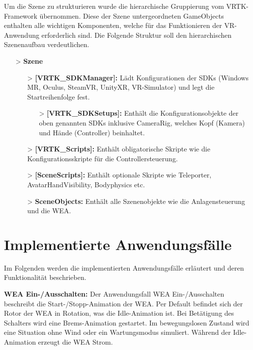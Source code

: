 Um die Szene zu strukturieren wurde die hierarchische Gruppierung vom VRTK-Framework übernommen. Diese der Szene untergeordneten GameObjects enthalten alle wichtigen Komponenten, welche für das Funktionieren der VR-Anwendung erforderlich sind. Die Folgende Struktur soll den hierarchischen Szenenaufbau verdeutlichen.

\begin{itemize}
\item[>] \textbf{Szene} 
	
	\begin{itemize}
	\item[>] \textbf{[VRTK\_SDKManager]:} Lädt Konfigurationen der SDKs (Windows MR, Oculus, SteamVR, UnityXR, VR-Simulator) und legt die Startreihenfolge fest.  	

		\begin{itemize}
			\item[>]\textbf{[VRTK\_SDKSetups]:} Enthält die Konfigurationsobjekte der oben genannten SDKs inklusive CameraRig, welches Kopf (Kamera) und Hände (Controller) beinhaltet.  		
		\end{itemize}
	
	\item[>] \textbf{[VRTK\_Scripts]:} Enthält obligatorische Skripte wie die Konfigurationsskripte für die Controllersteuerung.
					
	\item[>] \textbf{[SceneScripts]:} Enthält optionale Skripte wie Teleporter, AvatarHandVisibility, Bodyphysics etc.
	\item[>] \textbf{SceneObjects:} Enthält alle Szenenobjekte wie die Anlagensteuerung und die WEA.
	\end{itemize}
	
\end{itemize}


\section{Implementierte Anwendungsfälle}
\label{sec:ImplementierteAnwendungsfälle}

Im Folgenden werden die implementierten Anwendungsfälle erläutert und deren Funktionalität beschrieben.

\textbf{WEA Ein-/Ausschalten:} Der Anwendungsfall WEA Ein-/Ausschalten beschreibt die Start-/Stopp-Animation der WEA. Per Default befindet sich der Rotor der WEA in Rotation, was die Idle-Animation ist. Bei Betätigung des Schalters wird eine Brems-Animation gestartet. Im bewegungslosen Zustand wird eine Situation ohne Wind oder ein Wartungsmodus simuliert. Während der Idle-Animation erzeugt die WEA Strom.

